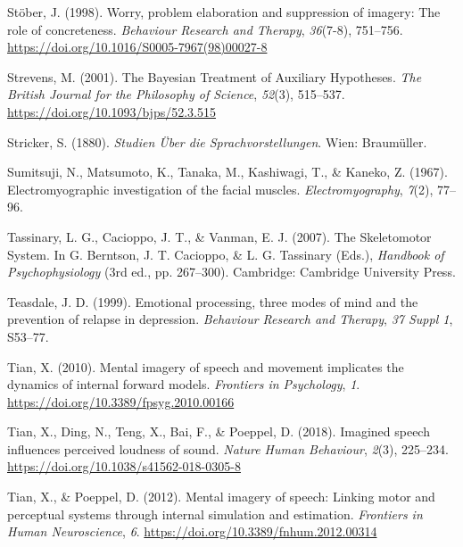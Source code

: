 \documentclass[a4paper,12pt,twoside,openright,oldfontcommands,final]{memoir}
\begin{document}
\leavevmode\hypertarget{ref-stober_worry_1998}{}%
Stöber, J. (1998). Worry, problem elaboration and suppression of imagery: The role of concreteness. \emph{Behaviour Research and Therapy}, \emph{36}(7-8), 751--756. \url{https://doi.org/10.1016/S0005-7967(98)00027-8}

\leavevmode\hypertarget{ref-strevens_bayesian_2001}{}%
Strevens, M. (2001). The Bayesian Treatment of Auxiliary Hypotheses. \emph{The British Journal for the Philosophy of Science}, \emph{52}(3), 515--537. \url{https://doi.org/10.1093/bjps/52.3.515}

\leavevmode\hypertarget{ref-stricker_studien_1880}{}%
Stricker, S. (1880). \emph{Studien Über die Sprachvorstellungen}. Wien: Braumüller.

\leavevmode\hypertarget{ref-sumitsuji_electromyographic_1967}{}%
Sumitsuji, N., Matsumoto, K., Tanaka, M., Kashiwagi, T., \& Kaneko, Z. (1967). Electromyographic investigation of the facial muscles. \emph{Electromyography}, \emph{7}(2), 77--96.

\leavevmode\hypertarget{ref-berntson_skeletomotor_2007}{}%
Tassinary, L. G., Cacioppo, J. T., \& Vanman, E. J. (2007). The Skeletomotor System. In G. Berntson, J. T. Cacioppo, \& L. G. Tassinary (Eds.), \emph{Handbook of Psychophysiology} (3rd ed., pp. 267--300). Cambridge: Cambridge University Press.

\leavevmode\hypertarget{ref-teasdale_emotional_1999}{}%
Teasdale, J. D. (1999). Emotional processing, three modes of mind and the prevention of relapse in depression. \emph{Behaviour Research and Therapy}, \emph{37 Suppl 1}, S53--77.

\leavevmode\hypertarget{ref-tian_mental_2010}{}%
Tian, X. (2010). Mental imagery of speech and movement implicates the dynamics of internal forward models. \emph{Frontiers in Psychology}, \emph{1}. \url{https://doi.org/10.3389/fpsyg.2010.00166}

\leavevmode\hypertarget{ref-tian_imagined_2018}{}%
Tian, X., Ding, N., Teng, X., Bai, F., \& Poeppel, D. (2018). Imagined speech influences perceived loudness of sound. \emph{Nature Human Behaviour}, \emph{2}(3), 225--234. \url{https://doi.org/10.1038/s41562-018-0305-8}

\leavevmode\hypertarget{ref-tian_mental_2012}{}%
Tian, X., \& Poeppel, D. (2012). Mental imagery of speech: Linking motor and perceptual systems through internal simulation and estimation. \emph{Frontiers in Human Neuroscience}, \emph{6}. \url{https://doi.org/10.3389/fnhum.2012.00314}
\end{document}
